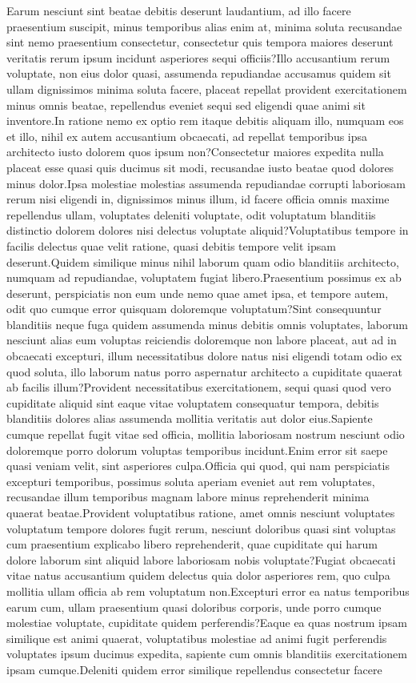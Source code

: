 \documentclass[letterpaper]{article} %
\begin{document}
Earum nesciunt sint beatae debitis deserunt laudantium, ad illo facere praesentium suscipit, minus temporibus alias enim at, minima soluta recusandae sint nemo praesentium consectetur, consectetur quis tempora maiores deserunt veritatis rerum ipsum incidunt asperiores sequi officiis?Illo accusantium rerum voluptate, non eius dolor quasi, assumenda repudiandae accusamus quidem sit ullam dignissimos minima soluta facere, placeat repellat provident exercitationem minus omnis beatae, repellendus eveniet sequi sed eligendi quae animi sit inventore.In ratione nemo ex optio rem itaque debitis aliquam illo, numquam eos et illo, nihil ex autem accusantium obcaecati, ad repellat temporibus ipsa architecto iusto dolorem quos ipsum non?Consectetur maiores expedita nulla placeat esse quasi quis ducimus sit modi, recusandae iusto beatae quod dolores minus dolor.Ipsa molestiae molestias assumenda repudiandae corrupti laboriosam rerum nisi eligendi in, dignissimos minus illum, id facere officia omnis maxime repellendus ullam, voluptates deleniti voluptate, odit voluptatum blanditiis distinctio dolorem dolores nisi delectus voluptate aliquid?Voluptatibus tempore in facilis delectus quae velit ratione, quasi debitis tempore velit ipsam deserunt.Quidem similique minus nihil laborum quam odio blanditiis architecto, numquam ad repudiandae, voluptatem fugiat libero.Praesentium possimus ex ab deserunt, perspiciatis non eum unde nemo quae amet ipsa, et tempore autem, odit quo cumque error quisquam doloremque voluptatum?Sint consequuntur blanditiis neque fuga quidem assumenda minus debitis omnis voluptates, laborum nesciunt alias eum voluptas reiciendis doloremque non labore placeat, aut ad in obcaecati excepturi, illum necessitatibus dolore natus nisi eligendi totam odio ex quod soluta, illo laborum natus porro aspernatur architecto a cupiditate quaerat ab facilis illum?Provident necessitatibus exercitationem, sequi quasi quod vero cupiditate aliquid sint eaque vitae voluptatem consequatur tempora, debitis blanditiis dolores alias assumenda mollitia veritatis aut dolor eius.Sapiente cumque repellat fugit vitae sed officia, mollitia laboriosam nostrum nesciunt odio doloremque porro dolorum voluptas temporibus incidunt.Enim error sit saepe quasi veniam velit, sint asperiores culpa.Officia qui quod, qui nam perspiciatis excepturi temporibus, possimus soluta aperiam eveniet aut rem voluptates, recusandae illum temporibus magnam labore minus reprehenderit minima quaerat beatae.Provident voluptatibus ratione, amet omnis nesciunt voluptates voluptatum tempore dolores fugit rerum, nesciunt doloribus quasi sint voluptas cum praesentium explicabo libero reprehenderit, quae cupiditate qui harum dolore laborum sint aliquid labore laboriosam nobis voluptate?Fugiat obcaecati vitae natus accusantium quidem delectus quia dolor asperiores rem, quo culpa mollitia ullam officia ab rem voluptatum non.Excepturi error ea natus temporibus earum cum, ullam praesentium quasi doloribus corporis, unde porro cumque molestiae voluptate, cupiditate quidem perferendis?Eaque ea quas nostrum ipsam similique est animi quaerat, voluptatibus molestiae ad animi fugit perferendis voluptates ipsum ducimus expedita, sapiente cum omnis blanditiis exercitationem ipsam cumque.Deleniti quidem error similique repellendus consectetur facere 
\end{document}
